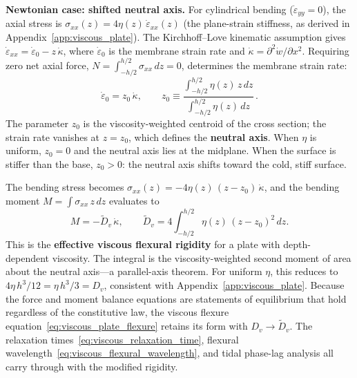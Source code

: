 \documentclass[11pt]{article}
\begin{document}
\medskip
\noindent\textbf{Newtonian case: shifted neutral axis.}  For cylindrical bending ($\dot{\varepsilon}_{yy} = 0$), the axial stress is $\sigma_{xx}(z) = 4\eta(z)\,\dot{\varepsilon}_{xx}(z)$ (the plane-strain stiffness, as derived in Appendix~\ref{app:viscous_plate}).  The Kirchhoff--Love kinematic assumption gives $\dot{\varepsilon}_{xx} = \dot{\varepsilon}_0 - z\,\dot{\kappa}$, where $\dot{\varepsilon}_0$ is the membrane strain rate and $\dot{\kappa} = \partial^2 \dot{w}/\partial x^2$.  Requiring zero net axial force, $N = \int_{-h/2}^{h/2}\!\sigma_{xx}\,dz = 0$, determines the membrane strain rate:
\begin{equation}
  \dot{\varepsilon}_0 = z_0\,\dot{\kappa}, \qquad z_0 \equiv \frac{\displaystyle\int_{-h/2}^{h/2}\!\eta(z)\,z\,dz}{\displaystyle\int_{-h/2}^{h/2}\!\eta(z)\,dz}\,.
  \label{eq:z0_newtonian}
\end{equation}
The parameter $z_0$ is the viscosity-weighted centroid of the cross section; the strain rate vanishes at $z = z_0$, which defines the \textbf{neutral axis}.  When $\eta$ is uniform, $z_0 = 0$ and the neutral axis lies at the midplane.  When the surface is stiffer than the base, $z_0 > 0$: the neutral axis shifts toward the cold, stiff surface.

\medskip
\noindent The bending stress becomes $\sigma_{xx}(z) = -4\eta(z)\,(z - z_0)\,\dot{\kappa}$, and the bending moment $M = \int\!\sigma_{xx}\,z\,dz$ evaluates to
\begin{equation}
  M = -\tilde{D}_v\,\dot{\kappa}, \qquad \boxed{\tilde{D}_v = 4\!\int_{-h/2}^{h/2}\!\eta(z)\,(z - z_0)^2\,dz.}
  \label{eq:Dv_tilde}
\end{equation}
This is the \textbf{effective viscous flexural rigidity} for a plate with depth-dependent viscosity.  The integral is the viscosity-weighted second moment of area about the neutral axis---a parallel-axis theorem.  For uniform $\eta$, this reduces to $4\eta\,h^3/12 = \eta\,h^3/3 = D_v$, consistent with Appendix~\ref{app:viscous_plate}.  Because the force and moment balance equations are statements of equilibrium that hold regardless of the constitutive law, the viscous flexure equation~\eqref{eq:viscous_plate_flexure} retains its form with $D_v \to \tilde{D}_v$.  The relaxation times~\eqref{eq:viscous_relaxation_time}, flexural wavelength~\eqref{eq:viscous_flexural_wavelength}, and tidal phase-lag analysis all carry through with the modified rigidity.
\end{document}
